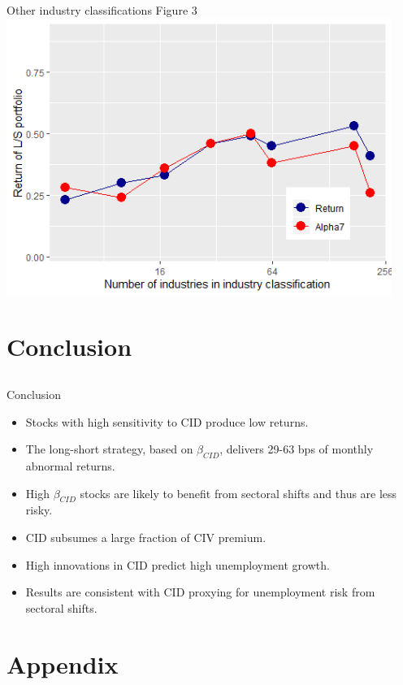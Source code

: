 \documentclass{beamer}
\begin{document}
\begin{frame}{Other industry classifications}
{Figure 3}
\includegraphics[width=0.94\textwidth]{Figure3_sl.png}
\end{frame}



\section{Conclusion}
\subsection{}


\normalsize
\begin{frame}{Conclusion}
\begin{itemize}
    \item {Stocks with high sensitivity to CID produce low returns.}
    \item {The long-short strategy, based on $\beta_{CID}$, delivers 29-63 bps of monthly abnormal returns.}
    \item {High $\beta_{CID}$ stocks are likely to benefit from sectoral shifts and thus are less risky.}
    \item {CID subsumes a large fraction of CIV premium.}
    \item {High innovations in CID predict high unemployment growth.}
    \item {Results are consistent with CID proxying for unemployment risk from sectoral shifts.}
\end{itemize}
\end{frame}


\section{Appendix}
\end{document}
